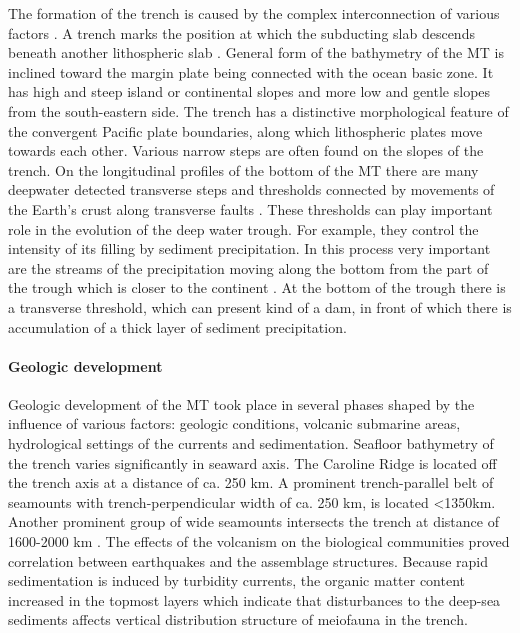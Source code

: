 \documentclass[11pt,a4paper]{report}
\begin{document}
The formation of the trench is caused by the complex interconnection of various factors \cite{Gardneretal2014}. A trench marks the position at which the subducting slab descends beneath another lithospheric slab \cite{DeschampsLallemand2003}. General form of the bathymetry of the \ac{MT} is inclined toward the margin plate being connected with the ocean basic zone. It has high and steep island or continental slopes and more low and gentle slopes from the south-eastern side. The trench has a distinctive morphological feature of the convergent Pacific plate boundaries, along which lithospheric plates move towards each other. Various narrow steps are often found on the slopes of the trench. On the longitudinal profiles of the bottom of the \ac{MT} there are many deepwater detected transverse steps and thresholds connected by movements of the Earth's crust along transverse faults \cite{Zhouetal2015}. These thresholds can play important role in the evolution of the deep water trough. For example, they control the intensity of its filling by sediment precipitation. In this process very important are the streams of the precipitation moving along the bottom from the part of the trough which is closer to the continent \cite{Tairaetal2004}. At the bottom of the trough there is a transverse threshold, which can present kind of a dam, in front of which there is accumulation of a thick layer of sediment precipitation.

\paragraph{Geologic development}
Geologic development of the \ac{MT} took place in several phases shaped by the influence of various factors: geologic conditions, volcanic submarine areas, hydrological settings of the currents and sedimentation. Seafloor bathymetry of the trench varies significantly in seaward axis. The Caroline Ridge is located off the trench axis at a distance of ca. 250 km. A prominent trench-parallel belt of seamounts with trench-perpendicular width of ca. 250 km, is located <1350km. Another prominent group of wide seamounts intersects the trench at distance of 1600-2000 km \cite{Zhangetal2014}. The effects of the volcanism on the biological communities \cite{Kitahashietal2014} proved correlation between earthquakes and the assemblage structures. Because rapid sedimentation is induced by turbidity currents, the organic matter content increased in the topmost layers which indicate that disturbances to the deep-sea sediments affects vertical distribution structure of meiofauna in the trench.
\end{document}
